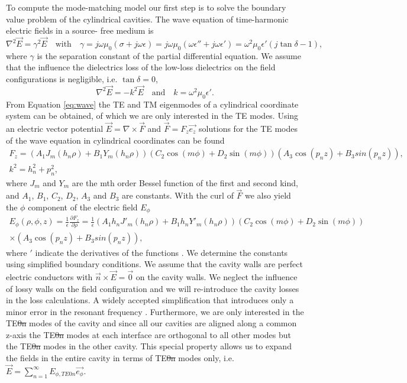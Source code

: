 To compute the mode-matching model our first step is to solve the boundary value problem of the cylindrical cavities. The wave equation of time-harmonic electric fields in a source- free medium is
\begin{equation}
\nabla^2\vec{E}=\gamma^2\vec{E} \quad\text{with}\quad \gamma=j\omega\mu_0(\sigma+j\omega\epsilon)=j\omega\mu_0(\omega\epsilon''+j\omega\epsilon ')=\omega^2\mu_0\epsilon '(j\tan\delta - 1)\text{,}
\end{equation}
where $\gamma$ is the separation constant of the partial differential equation. We assume that the influence the dielectrics loss of the low-loss dielectrics on the field configurations is negligible, i.e. $\tan\delta=0$,
\begin{equation}\label{eq:wave}
\nabla^2\vec{E}=-k^2\vec{E} \quad \text{and} \quad k=\omega^2\mu_0\epsilon '\text{.}
\end{equation}
From Equation \eqref{eq:wave} the TE and TM eigenmodes of a cylindrical coordinate system can be obtained, of which we are only interested in the TE modes. Using an electric vector potential $\vec{E}=\nabla\times\vec{F}$ and $\vec{F}=F_z\vec{e_z}$ solutions for the TE modes of the wave equation in cylindrical coordinates can be found
\begin{gather}
F_z=\left(A_1J_m(h_n\rho)+B_1Y_m(h_n\rho)\right)\left(C_2\cos(m\phi)+D_2\sin(m\phi)\right)\left(A_3\cos(p_nz)+B_3sin(p_nz)\right)\text{,}\\
k^2=h_n^2+p_n^2\text{,}
\end{gather}
where $J_m$ and $Y_m$ are the mth order Bessel function of the first and second kind, and $A_1$, $B_1$, $C_2$, $D_2$, $A_3$ and $B_3$ are constants. With the curl of $\vec{F}$ we also yield the $\phi$ component of the electric field $E_\phi$
\begin{equation}\begin{split}
E_\phi(\rho,\phi,z)=\frac{1}{\epsilon}\frac{\partial F_z}{\partial\rho}=\frac{1}{\epsilon}\left(A_1h_nJ'_m(h_n\rho)+B_1h_nY'_m(h_n\rho)\right)\left(C_2\cos(m\phi)+D_2\sin(m\phi)\right) \\ \times\left(A_3\cos(p_nz)+B_3sin(p_nz)\right)\text{,}\end{split}
\end{equation}
where $'$ indicate the derivatives of the functions \cite{balanis}. We determine the constants using simplified boundary conditions. We assume that the cavity walls are perfect electric conductors with $\vec{n}\times\vec{E}=\vec{0}$ on the cavity walls. We neglect the influence of lossy walls on the field configuration and we will re-introduce the cavity losses in the loss calculations. A widely accepted simplification that introduces only a minor error in the resonant frequency \cite{collin}. Furthermore, we are only interested in the TE\st{0n} modes of the cavity and since all our cavities are aligned along a common z-axis the TE\st{0n} modes at each interface are orthogonal to all other modes but the TE\st{0n} modes in the other cavity. This special property allows us to expand the fields in the entire cavity in terms of TE\st{0n} modes only, i.e. $\vec{E}=\sum_{n=1}^{\infty}E_{\phi,TE0n}\vec{e_\phi}$. 
